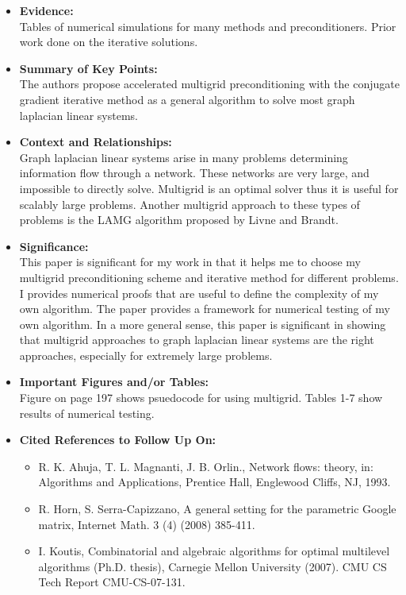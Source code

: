 \documentclass{article}
\begin{document}
\begin{itemize}
\begin{itemize}
\end{itemize}
\item{\textbf{Evidence:}}
\\
Tables of numerical simulations for many methods and preconditioners. Prior work done on the iterative solutions.

\item{\textbf{Summary of Key Points:}}
\\
The authors propose accelerated multigrid preconditioning with the conjugate gradient iterative method as a general algorithm to solve most graph laplacian linear systems.

\item{\textbf{Context and Relationships:}}
\\
Graph laplacian linear systems arise in many problems determining information flow through a network. These networks are very large, and impossible to directly solve. Multigrid is an optimal solver thus it is useful for scalably large problems. Another multigrid approach to these types of problems is the LAMG algorithm proposed by Livne and Brandt.

\item{\textbf{Significance:}}
\\
This paper is significant for my work in that it helps me to choose my multigrid preconditioning scheme and iterative method for different problems. I provides numerical proofs that are useful to define the complexity of my own algorithm. The paper provides a framework for numerical testing of my own algorithm. In a more general sense, this paper is significant in showing that multigrid approaches to graph laplacian linear systems are the right approaches, especially for extremely large problems. 

\item{\textbf{Important Figures and/or Tables:}}
\\
Figure on page 197 shows psuedocode for using multigrid. Tables 1-7 show results of numerical testing.

\item{\textbf{Cited References to Follow Up On:}}
\\
\begin{itemize}
\item
R. K. Ahuja, T. L. Magnanti, J. B. Orlin., Network flows: theory, in: Algorithms and Applications, Prentice Hall, Englewood Cliffs, NJ, 1993.

\item
R. Horn, S. Serra-Capizzano, A general setting for the parametric Google matrix, Internet Math. 3 (4) (2008) 385-411.
\item
I. Koutis, Combinatorial and algebraic algorithms for optimal multilevel algorithms (Ph.D. thesis), Carnegie Mellon University (2007). CMU CS Tech Report CMU-CS-07-131.
\end{itemize}
\end{itemize}
\end{document}
